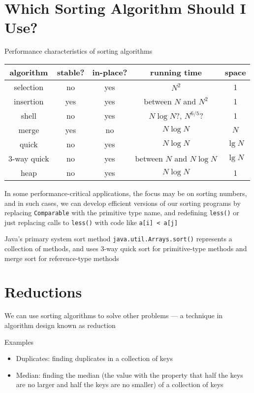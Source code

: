 \documentclass[8pt,a4paper,compress]{beamer}
\begin{document}
\section{Which Sorting Algorithm Should I Use?}
\begin{frame}[fragile]
\pause

Performance characteristics of sorting algorithms
\begin{center}
\begin{tabular}{ccccc}
algorithm & stable? & in-place? & running time & space \\ \hline
selection & no & yes & $N^2$ & 1 \\
insertion & yes & yes & between $N$ and $N^2$ & 1 \\
shell & no & yes & $N\log N$?, $N^{6/5}$? & 1 \\
merge & yes & no & $N\log N$ & $N$ \\
quick & no & yes & $N\log N$ & $\lg N$ \\
3-way quick & no & yes & between $N$ and $N\log N$ & $\lg N$ \\
heap & no & yes & $N\log N$ & 1
\end{tabular} 
\end{center}

\pause
\bigskip

In some performance-critical applications, the focus may be on sorting numbers, and in such cases, we can develop efficient versions of our sorting programs by replacing \lstinline$Comparable$ with the primitive type name, and redefining \lstinline$less()$ or just replacing calls to \lstinline$less()$ with code like \lstinline$a[i] < a[j]$

\pause
\bigskip

Java's primary system sort method  \lstinline$java.util.Arrays.sort()$ represents a collection of methods, and uses 3-way quick sort for primitive-type methods and merge sort for reference-type methods
\end{frame}

\section{Reductions}
\begin{frame}[fragile]
\pause

We can use sorting algorithms to solve other problems --- a technique in algorithm design known as reduction 

\pause
\bigskip

Examples
\begin{itemize}
\item Duplicates: finding duplicates in a collection of keys
\item Median: finding the median (the value with the property that half the keys are no larger and half the keys are no smaller) of a collection of keys
\end{itemize}
\end{frame}
\end{document}
